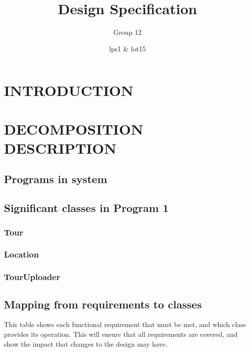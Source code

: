 \documentclass{project}
\begin{document}
\title{Design Specification}
\subtitle{Group 12}

    \author{lps1 \& lot15}     
    \maketitle

\tableofcontents

\section{INTRODUCTION}

\section{DECOMPOSITION DESCRIPTION}
    \subsection{Programs in system}
    \subsection{Significant classes in Program 1}
        \subsubsection{Tour}
            
        \subsubsection{Location}
            
        \subsubsection{TourUploader}
            
    \subsection{Mapping from requirements to classes}

        This table shows each functional requirement that must be met, and
        which class provides its operation. This will ensure that all
        requirements are covered, and show the impact that changes to the
        design may have.
\end{document}

